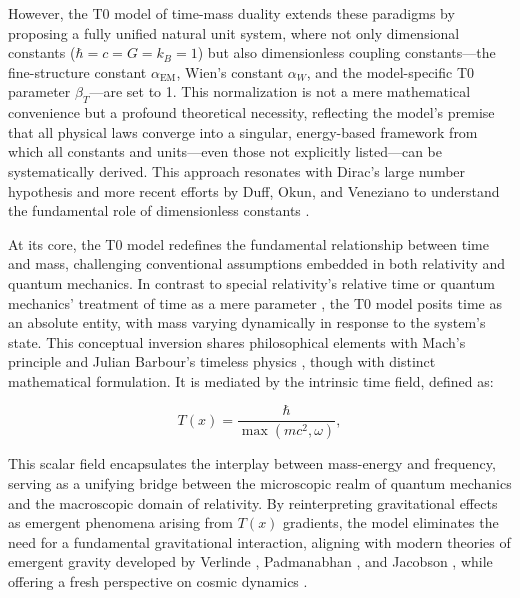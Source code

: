 \documentclass[twocolumn,aps,prl]{revtex4-2}
\begin{document}
	However, the T0 model of time-mass duality extends these paradigms by proposing a fully unified natural unit system, where not only dimensional constants ($\hbar = c = G = k_B = 1$) but also dimensionless coupling constants—the fine-structure constant $\alpha_{\text{EM}}$, Wien’s constant $\alpha_W$, and the model-specific T0 parameter $\beta_T$—are set to 1. This normalization is not a mere mathematical convenience but a profound theoretical necessity, reflecting the model’s premise that all physical laws converge into a singular, energy-based framework from which all constants and units—even those not explicitly listed—can be systematically derived. This approach resonates with Dirac’s large number hypothesis \cite{Dirac1937} and more recent efforts by Duff, Okun, and Veneziano to understand the fundamental role of dimensionless constants \cite{Duff2002}.
	
	At its core, the T0 model redefines the fundamental relationship between time and mass, challenging conventional assumptions embedded in both relativity and quantum mechanics. In contrast to special relativity’s relative time \cite{Einstein1905} or quantum mechanics’ treatment of time as a mere parameter \cite{Schrodinger1926}, the T0 model posits time as an absolute entity, with mass varying dynamically in response to the system’s state. This conceptual inversion shares philosophical elements with Mach’s principle \cite{Mach1893} and Julian Barbour’s timeless physics \cite{Barbour1999}, though with distinct mathematical formulation. It is mediated by the intrinsic time field, defined as:
	
	\begin{equation}
		T(x) = \frac{\hbar}{\max(mc^2, \omega)}, \label{eq:intrinsic_time}
	\end{equation}
	
	This scalar field encapsulates the interplay between mass-energy and frequency, serving as a unifying bridge between the microscopic realm of quantum mechanics and the macroscopic domain of relativity. By reinterpreting gravitational effects as emergent phenomena arising from $T(x)$ gradients, the model eliminates the need for a fundamental gravitational interaction, aligning with modern theories of emergent gravity developed by Verlinde \cite{Verlinde2011}, Padmanabhan \cite{Padmanabhan2012}, and Jacobson \cite{Jacobson1995}, while offering a fresh perspective on cosmic dynamics \cite{pascher_emergente_2025, pascher_part1_2025}.
	
\end{document}
